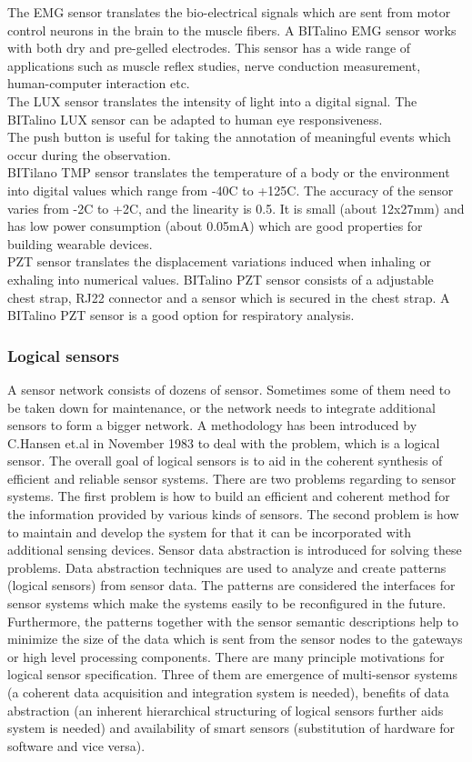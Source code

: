             The EMG sensor translates the bio-electrical signals which are sent from motor control neurons in the brain to the muscle fibers. A BITalino EMG sensor works with both dry and pre-gelled electrodes. This sensor has a wide range of applications such as muscle reflex studies, nerve conduction measurement, human-computer interaction etc.\\
            The LUX sensor translates the intensity of light into a digital signal. The BITalino LUX sensor can be adapted to human eye responsiveness.\\
            The push button is useful for taking the annotation of meaningful events which occur during the observation.\\
            BITilano TMP sensor translates the temperature of a body or the environment into digital values which range from -40C to +125C. The accuracy of the sensor varies from -2C to +2C, and the linearity is 0.5. It is small (about 12x27mm) and has low power consumption (about 0.05mA) which are good properties for building wearable devices.\\
            PZT sensor translates the displacement variations induced when inhaling or exhaling into numerical values. BITalino PZT sensor consists of a adjustable chest strap, RJ22 connector and a sensor which is secured in the chest strap. A BITalino PZT sensor is a good option for respiratory analysis.
        \subsubsection{Logical sensors}
            A sensor network consists of dozens of sensor. Sometimes some of them need to be taken down for maintenance, or the network needs to integrate additional sensors to form a bigger network. A methodology has been introduced by C.Hansen et.al\cite{LOGICALSENSOR_1} in November 1983 to deal with the problem, which is a logical sensor. The overall goal of logical sensors is to aid in the coherent synthesis of efficient and reliable sensor systems. There are two problems regarding to sensor systems\cite{LOGICALSENSOR_0}. The first problem is how to build an efficient and coherent method for the information provided by various kinds of sensors. The second problem is how to maintain and develop the system for that it can be incorporated with additional sensing devices. Sensor data abstraction is introduced for solving these problems. Data abstraction techniques are used to analyze and create patterns (logical sensors) from sensor data\cite{SensorDataAbstract}. The patterns are considered the interfaces for sensor systems which make the systems easily to be reconfigured in the future. Furthermore, the patterns together with the sensor semantic descriptions help to minimize the size of the data which is sent from the sensor nodes to the gateways or high level processing components. There are many principle motivations for logical sensor specification. Three of them are emergence of multi-sensor systems (a coherent data acquisition and integration system is needed), benefits of data abstraction (an inherent hierarchical structuring of logical sensors further aids system is needed) and availability of smart sensors (substitution of hardware for software and vice versa)\cite{LOGICALSENSOR_3}.
